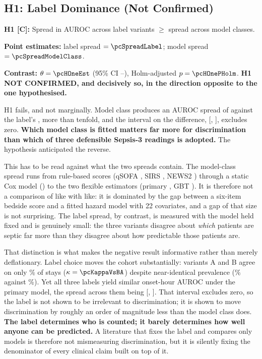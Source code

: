 \subsection{H1: Label Dominance (Not Confirmed)}

\begin{mdframed}[backgroundcolor=ATUOrange!20, linecolor=ATUOrange]
    \textbf{H1 [C]:} Spread in AUROC across label variants $\geq$ spread across
    model classes.

    \textbf{Point estimates:} label spread $= \pcSpreadLabel$;
    model spread $= \pcSpreadModelClass$.

    \textbf{Contrast:} $\theta = \pcHOneEst$ (95\% CI
    \pcHOneCiLo--\pcHOneCiHi), Holm-adjusted $p = \pcHOnePHolm$.
    \textbf{H1 NOT CONFIRMED, and decisively so, in the direction opposite
    to the one hypothesised.}
\end{mdframed}

H1 fails, and not marginally. Model class produces an AUROC spread of
\pcSpreadModelClass{} against the label's \pcSpreadLabel{}, more than
tenfold, and the interval on the difference,
[\pcHOneCiLo, \pcHOneCiHi], excludes zero. \textbf{Which model class is fitted
matters far more for discrimination than which of three defensible Sepsis-3
readings is adopted.} The hypothesis anticipated the reverse.

This has to be read against what the two spreads contain. The model-class
spread runs from rule-based scores (qSOFA \pcAurocQsofaB, SIRS \pcAurocSirsB,
NEWS2 \pcAurocNewsB) through a static Cox model (\pcAurocCoxB) to the two
flexible estimators (primary \pcAurocPrimaryB, GBT \pcAurocGbtB). It is
therefore not a comparison of like with like: it is dominated by the gap between
a six-item bedside score and a fitted hazard model with 22 covariates, and a
gap of that size is not surprising. The label spread, by contrast, is measured
with the model held fixed and is genuinely small: the three variants disagree
about \emph{which} patients are septic far more than they disagree about how
predictable those patients are.

That distinction is what makes the negative result informative rather than
merely deflationary. Label choice moves the cohort substantially: variants A
and B agree on only \pcPctAgreeBA\% of stays ($\kappa = \pcKappaVsBA$) despite
near-identical prevalence (\pcPctOnsetsA\% against \pcPctOnsetsB\%). Yet all
three labels yield similar onset-hour AUROC under the primary model, the spread
across them being \pcSpreadLabel{} [\pcSpreadLabelCiLo, \pcSpreadLabelCiHi].
That interval excludes zero, so the label is not shown to be irrelevant to
discrimination; it is shown to move discrimination by roughly an order of
magnitude less than the model class does. \textbf{The label determines who is
counted; it barely determines how well anyone can be predicted.} A literature that fixes the label and compares only models is
therefore not mismeasuring discrimination, but it is silently fixing the
denominator of every clinical claim built on top of it.

